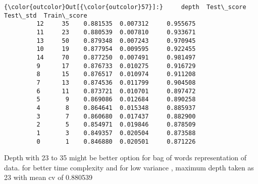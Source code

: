\documentclass[11pt]{article}
\begin{document}
\begin{Verbatim}[commandchars=\\\{\}]
{\color{outcolor}Out[{\color{outcolor}57}]:}     depth  Test\_score  Test\_std  Train\_score
         12     35    0.881535  0.007312     0.955675
         11     23    0.880539  0.007810     0.933671
         13     50    0.879348  0.007243     0.970945
         10     19    0.877954  0.009595     0.922455
         14     70    0.877250  0.007491     0.981497
         9      17    0.876733  0.010275     0.916729
         8      15    0.876517  0.010974     0.911208
         7      13    0.874536  0.011799     0.904508
         6      11    0.873721  0.010701     0.897472
         5       9    0.869086  0.012684     0.890258
         4       8    0.864641  0.015348     0.885937
         3       7    0.860680  0.017437     0.882900
         2       5    0.854971  0.019846     0.878509
         1       3    0.849357  0.020504     0.873588
         0       1    0.846880  0.020501     0.871226
\end{Verbatim}
            
    Depth with 23 to 35 might be better option for bag of words
representation of data. for better time complexity and for low variance
, maximum depth taken as 23 with mean cv of 0.880539
\end{document}
